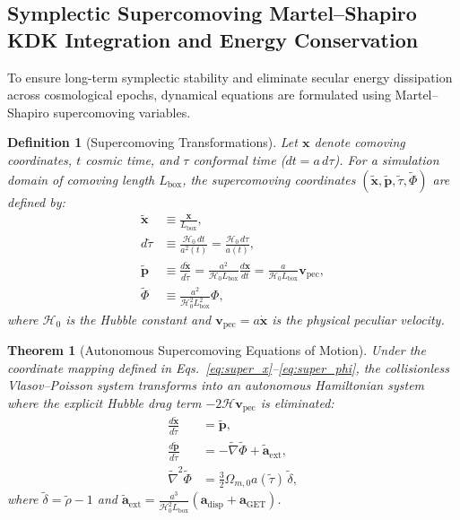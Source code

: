 \documentclass[11pt]{article}
\theoremstyle{plain}
\newtheorem{theorem}{Theorem}
\newtheorem{definition}{Definition}
\begin{document}
\subsection{Symplectic Supercomoving Martel--Shapiro KDK Integration and Energy Conservation}
\label{app:supercomoving-kdk-energy-conservation}
\label{app:martel-shapiro-leapfrog}
To ensure long-term symplectic stability and eliminate secular energy dissipation across cosmological epochs, dynamical equations are formulated using Martel--Shapiro supercomoving variables.

\begin{definition}[Supercomoving Transformations]
Let $\mathbf{x}$ denote comoving coordinates, $t$ cosmic time, and $\tau$ conformal time ($dt = a\, d\tau$). For a simulation domain of comoving length $L_{\mathrm{box}}$, the supercomoving coordinates $(\tilde{\mathbf{x}}, \tilde{\mathbf{p}}, \tilde{\tau}, \tilde{\Phi})$ are defined by:
\begin{align}
\tilde{\mathbf{x}} &\equiv \frac{\mathbf{x}}{L_{\mathrm{box}}}, \label{eq:super_x} \\
d\tilde{\tau} &\equiv \frac{\mathcal{H}_0\, dt}{a^2(t)} = \frac{\mathcal{H}_0\, d\tau}{a(t)}, \label{eq:super_t} \\
\tilde{\mathbf{p}} &\equiv \frac{d\tilde{\mathbf{x}}}{d\tilde{\tau}} = \frac{a^2}{\mathcal{H}_0 L_{\mathrm{box}}} \frac{d\mathbf{x}}{dt} = \frac{a}{\mathcal{H}_0 L_{\mathrm{box}}} \mathbf{v}_{\mathrm{pec}}, \label{eq:super_v} \\
\tilde{\Phi} &\equiv \frac{a^2}{\mathcal{H}_0^2 L_{\mathrm{box}}^2} \Phi, \label{eq:super_phi}
\end{align}
where $\mathcal{H}_0$ is the Hubble constant and $\mathbf{v}_{\mathrm{pec}} = a \dot{\mathbf{x}}$ is the physical peculiar velocity.
\end{definition}

\begin{theorem}[Autonomous Supercomoving Equations of Motion]
Under the coordinate mapping defined in Eqs.~\eqref{eq:super_x}--\eqref{eq:super_phi}, the collisionless Vlasov--Poisson system transforms into an autonomous Hamiltonian system where the explicit Hubble drag term $-2\mathcal{H}\mathbf{v}_{\mathrm{pec}}$ is eliminated:
\begin{align}
\frac{d\tilde{\mathbf{x}}}{d\tilde{\tau}} &= \tilde{\mathbf{p}}, \label{eq:eom_x} \\
\frac{d\tilde{\mathbf{p}}}{d\tilde{\tau}} &= -\tilde{\nabla}\tilde{\Phi} + \tilde{\mathbf{a}}_{\mathrm{ext}}, \label{eq:eom_v} \\
\tilde{\nabla}^2 \tilde{\Phi} &= \frac{3}{2} \Omega_{m,0} a(\tilde{\tau})\, \tilde{\delta}, \label{eq:super_poisson}
\end{align}
where $\tilde{\delta} = \tilde{\rho} - 1$ and $\tilde{\mathbf{a}}_{\mathrm{ext}} = \frac{a^3}{\mathcal{H}_0^2 L_{\mathrm{box}}} (\mathbf{a}_{\mathrm{disp}} + \mathbf{a}_{\mathrm{GET}})$.
\end{theorem}
\end{document}
